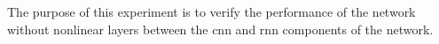 
The purpose of this experiment is to verify the performance
of the network without nonlinear layers between the
\gls{cnn} and \gls{rnn} components of the network.

